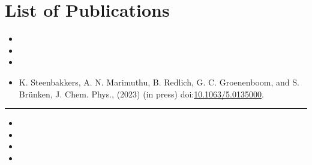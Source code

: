 \chapter{List of Publications}

\begin{itemize}
    \item {}
    \item {}
    \item {}
    \item K. Steenbakkers, A. N. Marimuthu, B. Redlich, G. C. Groenenboom, and S. Br\"unken, J. Chem. Phys., (2023) (in press) doi:\url{10.1063/5.0135000}.
\end{itemize}

\hrule

\begin{itemize}
    \item {}
    \item {}
    \item {}
    \item {}
\end{itemize}
